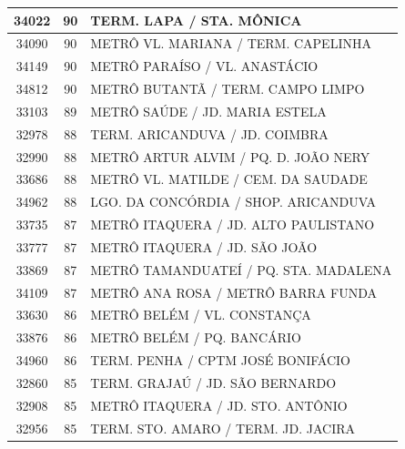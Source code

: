 \documentclass[
	12pt,				%
	oneside,			%
	a4paper,			%
	english,			%
	brazil				%
	]{abntex2ppgsi}
\begin{document}
{{\begin{apendicesenv}
\begin{longtable}{c|c|p{7cm}}
    34022 & 90    & TERM. LAPA / STA. MÔNICA \\
\hline

    34090 & 90    & METRÔ VL. MARIANA / TERM. CAPELINHA \\
\hline

    34149 & 90    & METRÔ PARAÍSO / VL. ANASTÁCIO \\
\hline

    34812 & 90    & METRÔ BUTANTÃ / TERM. CAMPO LIMPO \\
\hline

    33103 & 89    & METRÔ SAÚDE / JD. MARIA ESTELA \\
\hline

    32978 & 88    & TERM. ARICANDUVA / JD. COIMBRA \\
\hline

    32990 & 88    & METRÔ ARTUR ALVIM / PQ. D. JOÃO NERY \\
\hline

    33686 & 88    & METRÔ VL. MATILDE / CEM. DA SAUDADE \\
\hline

    34962 & 88    & LGO. DA CONCÓRDIA / SHOP. ARICANDUVA \\
\hline

    33735 & 87    & METRÔ ITAQUERA / JD. ALTO PAULISTANO \\
\hline

    33777 & 87    & METRÔ ITAQUERA / JD. SÃO JOÃO \\
\hline

    33869 & 87    & METRÔ TAMANDUATEÍ / PQ. STA. MADALENA \\
\hline

    34109 & 87    & METRÔ ANA ROSA / METRÔ BARRA FUNDA \\
\hline

    33630 & 86    & METRÔ BELÉM / VL. CONSTANÇA \\
\hline

    33876 & 86    & METRÔ BELÉM / PQ. BANCÁRIO \\
\hline

    34960 & 86    & TERM. PENHA / CPTM JOSÉ BONIFÁCIO \\
\hline

    32860 & 85    & TERM. GRAJAÚ / JD. SÃO BERNARDO \\
\hline

    32908 & 85    & METRÔ ITAQUERA / JD. STO. ANTÔNIO \\
\hline

    32956 & 85    & TERM. STO. AMARO / TERM. JD. JACIRA \\
\hline


\end{longtable}
\end{apendicesenv}}}
\end{document}
